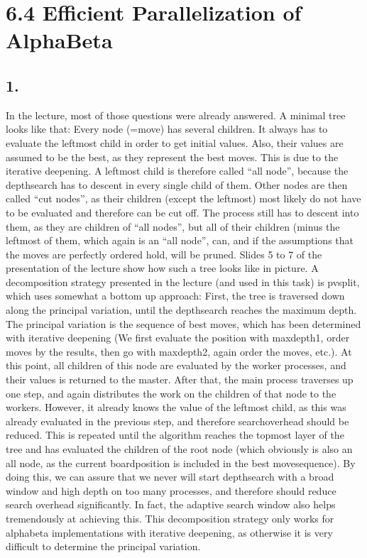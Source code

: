 \section*{6.4 Efficient Parallelization of AlphaBeta}

\subsection*{1.}
In the lecture, most of those questions were already answered. A minimal tree looks like that: Every node (=move) has several children. It always has to evaluate the leftmost child in order to get initial values. Also, their values are assumed to be the best, as they represent the best moves. This is due to the iterative deepening. A leftmost child is therefore called ``all node'', because the depthsearch has to descent in every single child of them. Other nodes are then called ``cut nodes'', as their children (except the leftmost) most likely do not have to be evaluated and therefore can be cut off. The process still has to descent into them, as they are children of ``all nodes'', but all of their children (minus the leftmost of them, which again is an ``all node'', can, and if the assumptions that the moves are perfectly ordered hold, will be pruned. Slides 5 to 7 of the presentation of the lecture show how such a tree looks like in picture.
A decomposition strategy presented in the lecture (and used in this task) is pvsplit, which uses somewhat a bottom up approach: First, the tree is traversed down along the principal variation, until the depthsearch reaches the maximum depth. The principal variation is the sequence of best moves, which has been determined with iterative deepening (We first evaluate the position with maxdepth1, order moves by the results, then go with maxdepth2, again order the moves, etc.). At this point, all children of this node are evaluated by the worker processes, and their values is returned to the master. After that, the main process traverses up one step, and again distributes the work on the children of that node to the workers. However, it already knows the value of the leftmost child, as this was already evaluated in the previous step, and therefore searchoverhead should be reduced. This is repeated until the algorithm reaches the topmost layer of the tree and has evaluated the children of the root node (which obviously is also an all node, as the current boardposition is included in the best movesequence). By doing this, we can assure that we never will start depthsearch with a broad window and high depth on too many processes, and therefore should reduce search overhead significantly. In fact, the adaptive search window also helps tremendously at achieving this. This decomposition strategy only works for alphabeta implementations with iterative deepening, as otherwise it is very difficult to determine the principal variation.

